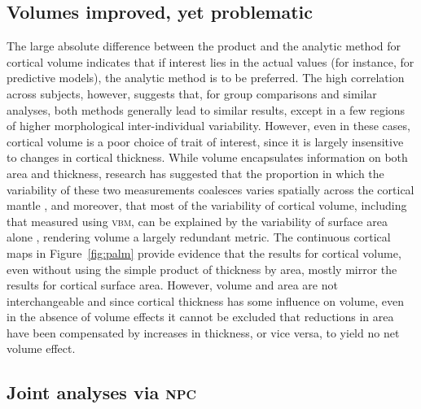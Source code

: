 \subsection{Volumes improved, yet problematic}

The large absolute difference between the product and the analytic method for cortical volume indicates that if interest lies in the actual values (for instance, for predictive models), the analytic method is to be preferred. The high correlation across subjects, however, suggests that, for group comparisons and similar analyses, both methods generally lead to similar results, except in a few regions of higher morphological inter-individual variability. However, even in these cases, cortical volume is a poor choice of trait of interest, since it is largely insensitive to changes in cortical thickness. While volume encapsulates information on both area and thickness, research has suggested that the proportion in which the variability of these two measurements coalesces varies spatially across the cortical mantle \citep{Winkler2010}, and moreover, that most of the variability of cortical volume, including that measured using \textsc{vbm}, can be explained by the variability of surface area alone \citep{Voets2008, Lenroot2009, Winkler2010, Rimol2012}, rendering volume a largely redundant metric. The continuous cortical maps in Figure~\ref{fig:palm} provide evidence that the results for cortical volume, even without using the simple product of thickness by area, mostly mirror the results for cortical surface area. However, volume and area are not interchangeable and since cortical thickness has some influence on volume, even in the absence of volume effects it cannot be excluded that reductions in area have been compensated by increases in thickness, or vice versa, to yield no net volume effect.

\subsection{Joint analyses via \textsc{npc}}

